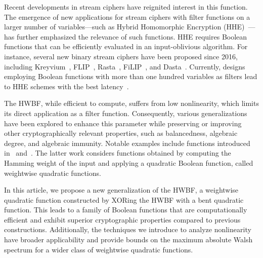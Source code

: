 \documentclass[11pt]{llncs}
\begin{document}
Recent developments in stream ciphers have reignited interest in this function. The emergence of new applications for stream ciphers with filter functions on a larger number of variables—such as Hybrid Homomorphic Encryption (HHE)~\cite{CCS:NaeLauVai11}—has further emphasized the relevance of such functions. HHE requires Boolean functions that can be efficiently evaluated in an input-oblivious algorithm. For instance, several new binary stream ciphers have been proposed since 2016, including Kreyvium~\cite{JOC:CCFLNP18}, FLIP~\cite{EC:MJSC16}, Rasta~\cite{C:Rasta}, FiLIP~\cite{INDO:MCJS19}, and Dasta~\cite{TOSC:BeiLea20}. Currently, designs employing Boolean functions with more than one hundred variables as filters lead to HHE schemes with the best latency~\cite{INDO:HofMeaRic20,CCS:CDPP22,CIC:MeaParPei24}.

The HWBF, while efficient to compute, suffers from low nonlinearity, which limits its direct application as a filter function. Consequently, various generalizations have been explored to enhance this parameter while preserving or improving other cryptographically relevant properties, such as balancedness, algebraic degree, and algebraic immunity. Notable examples include functions introduced in~\cite{IEEE:Carlet22,eprint:CarPar23} and~\cite{DAM:MeaOza24}. The latter work considers functions obtained by computing the Hamming weight of the input and applying a quadratic Boolean function, called weightwise quadratic functions.

In this article, we propose a new generalization of the HWBF, a weightwise quadratic function constructed by XORing the HWBF with a bent quadratic function. This leads to a family of Boolean functions that are computationally efficient and exhibit superior cryptographic properties compared to previous constructions. 
Additionally, the techniques we introduce to analyze nonlinearity have broader applicability and provide bounds on the maximum absolute Walsh spectrum for a wider class of weightwise quadratic functions.
\end{document}
